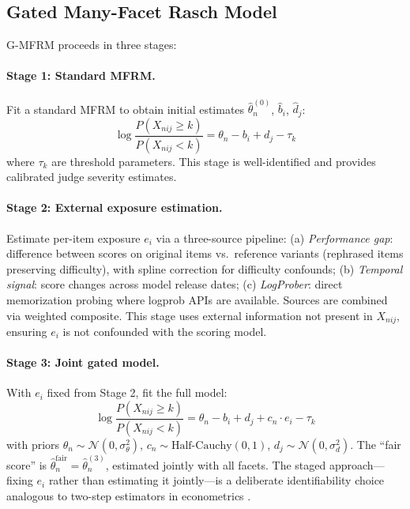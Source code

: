 \documentclass[11pt]{article}
\begin{document}
\subsection{Gated Many-Facet Rasch Model}

G-MFRM proceeds in three stages:

\paragraph{Stage 1: Standard MFRM.}
Fit a standard MFRM to obtain initial estimates $\hat{\theta}_n^{(0)}$, $\hat{b}_i$, $\hat{d}_j$:
\begin{equation}
\log \frac{P(X_{nij} \geq k)}{P(X_{nij} < k)} = \theta_n - b_i + d_j - \tau_k
\end{equation}
where $\tau_k$ are threshold parameters. This stage is well-identified and provides calibrated judge severity estimates.

\paragraph{Stage 2: External exposure estimation.}
Estimate per-item exposure $e_i$ via a three-source pipeline:
(a) \emph{Performance gap}: difference between scores on original items vs.\ reference variants (rephrased items preserving difficulty), with spline correction for difficulty confounds;
(b) \emph{Temporal signal}: score changes across model release dates;
(c) \emph{LogProber}: direct memorization probing where logprob APIs are available.
Sources are combined via weighted composite. This stage uses external information not present in $X_{nij}$, ensuring $e_i$ is not confounded with the scoring model.

\paragraph{Stage 3: Joint gated model.}
With $e_i$ fixed from Stage 2, fit the full model:
\begin{equation}
\log \frac{P(X_{nij} \geq k)}{P(X_{nij} < k)} = \theta_n - b_i + d_j + c_n \cdot e_i - \tau_k
\label{eq:gmfrm}
\end{equation}
with priors $\theta_n \sim \mathcal{N}(0, \sigma_\theta^2)$, $c_n \sim \text{Half-Cauchy}(0, 1)$, $d_j \sim \mathcal{N}(0, \sigma_d^2)$.
The ``fair score'' is $\hat{\theta}_n^{\text{fair}} = \hat{\theta}_n^{(3)}$, estimated jointly with all facets.
The staged approach---fixing $e_i$ rather than estimating it jointly---is a deliberate identifiability choice analogous to two-step estimators in econometrics \cite{heckman1979sample}.
\end{document}
